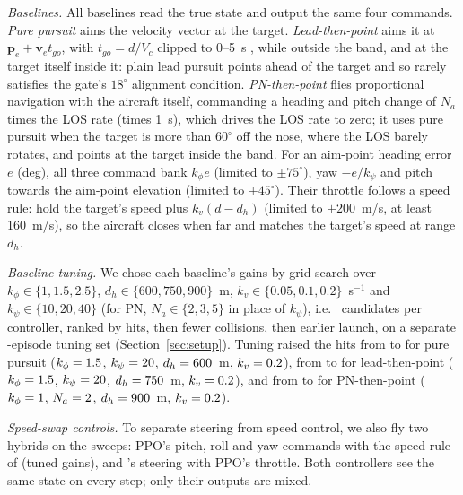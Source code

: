 \documentclass[conference]{IEEEtran}
\begin{document}
\emph{Baselines.} All baselines read the true state and output the same four commands. \emph{Pure pursuit} aims the velocity vector at the target. \emph{Lead-then-point} aims it at $\mathbf{p}_e+\mathbf{v}_e t_{go}$, with $t_{go}=d/V_c$ clipped to 0--5~s \cite{shneydor1998pursuit}, while outside the band, and at the target itself inside it: plain lead pursuit points ahead of the target and so rarely satisfies the gate's $18^\circ$ alignment condition. \emph{PN-then-point} flies proportional navigation with the aircraft itself, commanding a heading and pitch change of $N_a$ times the LOS rate (times 1~s), which drives the LOS rate to zero; it uses pure pursuit when the target is more than $60^\circ$ off the nose, where the LOS barely rotates, and points at the target inside the band. For an aim-point heading error $e$ (deg), all three command bank $k_\phi e$ (limited to $\pm75^\circ$), yaw $-e/k_\psi$ and pitch towards the aim-point elevation (limited to $\pm45^\circ$). Their throttle follows a speed rule: hold the target's speed plus $k_v(d-d_h)$ (limited to $\pm200$~m/s, at least 160~m/s), so the aircraft closes when far and matches the target's speed at range $d_h$.

\emph{Baseline tuning.} We chose each baseline's gains by grid search over $k_\phi\in\{1,1.5,2.5\}$, $d_h\in\{600,750,900\}$~m, $k_v\in\{0.05,0.1,0.2\}$~s$^{-1}$ and $k_\psi\in\{10,20,40\}$ (for PN, $N_a\in\{2,3,5\}$ in place of $k_\psi$), i.e.\ \RTuneCandidates{} candidates per controller, ranked by hits, then fewer collisions, then earlier launch, on a separate \RTuneEpisodes-episode tuning set (Section~\ref{sec:setup}). Tuning raised the hits from \RPureTuneDefaultHits{} to \RPureTuneHits{} for pure pursuit ($k_\phi=1.5$, $k_\psi=20$, $d_h=600$~m, $k_v=0.2$), from \RLeadTuneDefaultHits{} to \RLeadTuneHits{} for lead-then-point ($k_\phi=1.5$, $k_\psi=20$, $d_h=750$~m, $k_v=0.2$), and from \RPnTuneDefaultHits{} to \RPnTuneHits{} for PN-then-point ($k_\phi=1$, $N_a=2$, $d_h=900$~m, $k_v=0.2$).

\emph{Speed-swap controls.} To separate steering from speed control, we also fly two hybrids on the sweeps: PPO's pitch, roll and yaw commands with the speed rule of \RSwapRule{} (tuned gains), and \RSwapRule's steering with PPO's throttle. Both controllers see the same state on every step; only their outputs are mixed.

\end{document}
